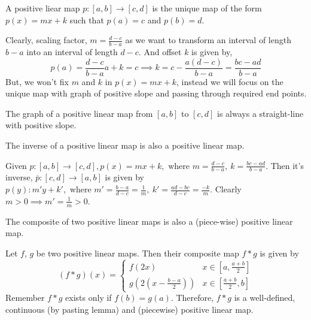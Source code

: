 \begin{definition}
	A positive liear map $p : [a,b] \to [c,d]$ is the unique map of the form $p(x) = mx+k$ such that $p(a) = c$ and $p(b)=d$.
	\begin{commentary}
		Clearly, scaling factor, $m =  \frac{d-c}{b-a}$ as we want to transform an interval of length $b-a$ into an interval of length $d-c$. And offset $k$ is given by,
		\[ p(a) = \frac{d-c}{b-a}a+k = c \implies k = c - \frac{a(d-c)}{b-a} = \frac{bc-ad}{b-a} \]
		But, we won't fix $m$ and $k$ in $p(x) = mx+k$, instead we will focus on the unique map with graph of positive slope and passing through required end points.
	\end{commentary}
	The graph of a positive linear map from $[a,b]$ to $[c,d]$ is always a straight-line with positive slope.
\end{definition}

\begin{remark}
	The inverse of a positive linear map is also a positive linear map.
	\begin{commentary}
		Given $p : [a,b] \to [c,d], p(x) = mx+k,\text{ where } m = \frac{d-c}{b-a},\ k = \frac{bc-ad}{b-a}$. Then it's inverse, $\bar{p} : [c,d] \to [a,b]$ is given by $p(y) : m'y+k',\text{ where } m' = \frac{b-a}{d-c} = \frac{1}{m},\ k' =  \frac{ad-bc}{d-c} = \frac{-k}{m}$. Clearly $m > 0 \implies m' = \frac{1}{m} > 0$.
	\end{commentary}
\end{remark}

\begin{remark}
	The composite of two positive linear maps is also a (piece-wise) positive linear map. \begin{commentary} Let $f$, $g$ be two positive linear maps. Then their composite map $f \ast g$ is given by
	\[ (f \ast g) (x) = \begin{cases} f(2x) & x \in [a,\frac{a+b}{2}] \\ g(2\left(x-\frac{b-a}{2}\right)) & x \in [\frac{a+b}{2},b] \end{cases} \]
		Remember $f \ast g$ exists only if $f(b) = g(a)$. Therefore, $f \ast g$ is a well-defined, continuous (by pasting lemma) and (piecewise) positive linear map.
	\end{commentary}
\end{remark}

